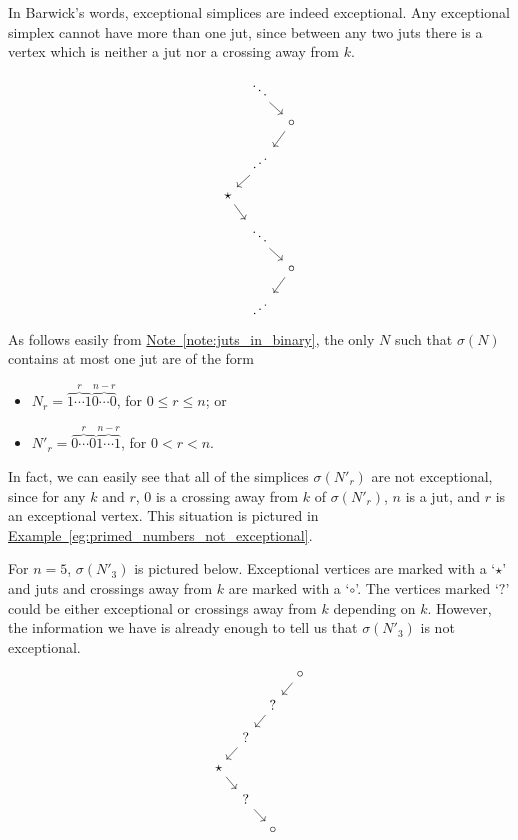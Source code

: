 \documentclass[main.tex]{subfiles}
\begin{document}
In Barwick's words, exceptional simplices are indeed exceptional. Any exceptional simplex cannot have more than one jut, since between any two juts there is a vertex which is neither a jut nor a crossing away from $k$.
\begin{equation*}
  \begin{tikzcd}[column sep=tiny, row sep=small]
    & \ddots
    \arrow[dr]
    \\
    && \circ
    \arrow[dl]
    \\
    & \iddots
    \arrow[dl]
    \\
    \star
    \arrow[dr]
    \\
    & \ddots
    \arrow[dr]
    \\
    && \circ
    \arrow[dl]
    \\
    & \iddots
  \end{tikzcd}
\end{equation*}
As follows easily from \hyperref[note:juts_in_binary]{Note~\ref*{note:juts_in_binary}}, the only $N$ such that $\sigma(N)$ contains at most one jut are of the form
\begin{itemize}
  \item $N_{r} = \overbrace{1\cdots 1}^{r}\overbrace{0\cdots 0}^{n-r}$, for $0 \leq r \leq n$; or

  \item $N'_{r} = \overbrace{0\cdots 0}^{r}\overbrace{1\cdots 1}^{n-r}$, for $0 < r < n$.
\end{itemize}

In fact, we can easily see that all of the simplices $\sigma(N'_{r})$ are not exceptional, since for any $k$ and $r$, 0 is a crossing away from $k$ of $\sigma(N'_{r})$, $n$ is a jut, and $r$ is an exceptional vertex. This situation is pictured in \hyperref[eg:primed_numbers_not_exceptional]{Example~\ref*{eg:primed_numbers_not_exceptional}}.

\begin{example}
  \label{eg:primed_numbers_not_exceptional}
  For $n = 5$, $\sigma(N'_{3})$ is pictured below. Exceptional vertices are marked with a `$\star$' and juts and crossings away from $k$ are marked with a `$\circ$'. The vertices marked `$?$' could be either exceptional or crossings away from $k$ depending on $k$. However, the information we have is already enough to tell us that $\sigma(N'_{3})$ is not exceptional.
  \begin{equation*}
    \begin{tikzcd}[column sep=tiny, row sep=small]
      &&& \circ
      \arrow[dl]
      \\
      && ?
      \arrow[dl]
      \\
      & ?
      \arrow[dl]
      \\
      \star
      \arrow[dr]
      \\
      & ?
      \arrow[dr]
      \\
      && \circ
    \end{tikzcd}
  \end{equation*}
\end{example}
\end{document}

